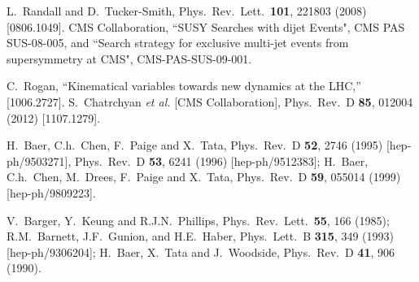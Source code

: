 \documentclass[12pt]{article}
\begin{document}
\begin{thebibliography}{999}
  L.~Randall and D.~Tucker-Smith,
  Phys.\ Rev.\ Lett.\  {\bf 101}, 221803 (2008)
  [0806.1049].
CMS Collaboration, ``SUSY Searches with dijet Events", CMS PAS SUS-08-005, and
``Search strategy for exclusive multi-jet events from supersymmetry at CMS",
CMS-PAS-SUS-09-001.

  C.~Rogan,
  ``Kinematical variables towards new dynamics at the LHC,''
  [1006.2727].
S.~Chatrchyan {\it et al.} [CMS Collaboration],
  Phys.\ Rev.\ D {\bf 85}, 012004 (2012)
  [1107.1279].
  
H.~Baer, C.h.~Chen, F.~Paige and X.~Tata,
  Phys.\ Rev.\ D {\bf 52}, 2746 (1995)
  [hep-ph/9503271],
  Phys.\ Rev.\ D {\bf 53}, 6241 (1996)
  [hep-ph/9512383];
H.~Baer, C.h.~Chen, M.~Drees, F.~Paige and X.~Tata,
  Phys.\ Rev.\ D {\bf 59}, 055014 (1999)
  [hep-ph/9809223].

V.~Barger, Y.~Keung and R.J.N.~Phillips, 
  Phys.\ Rev.\ Lett.\  {\bf 55}, 166 (1985);
R.M.~Barnett, J.F.~Gunion, and H.E.~Haber, 
  Phys.\ Lett.\ B {\bf 315}, 349 (1993)
  [hep-ph/9306204];
H.~Baer, X.~Tata and J.~Woodside, 
  Phys.\ Rev.\ D {\bf 41}, 906 (1990).


\end{thebibliography}
\end{document}
